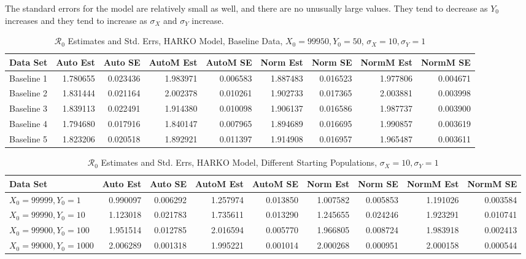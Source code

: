 \documentclass[12pt]{article}
\newcommand{\rr}{\ensuremath{\mathcal{R}_0}}
\begin{document}
The standard errors for the model are relatively small as well, and there are no unusually large values. They tend to decrease as $Y_0$ increases and they tend to increase as $\sigma_X$ and $\sigma_Y$ increase.

\begin{table}[H]
	
	\caption{$\rr$ Estimates and Std. Errs, HARKO Model, 
		Baseline Data, $X_0 = 99950, Y_0 = 50$, 
		$\sigma_X = 10, \sigma_Y = 1$}
	\begin{footnotesize}
		\hskip -1cm
		\begin{tabular}{l|r|r|r|r|r|r|r|r}
			\hline
			Data Set & Auto Est & Auto SE & AutoM Est & AutoM SE & Norm Est & Norm SE & NormM Est & NormM SE\\
			\hline
			Baseline 1 & 1.780655 & 0.023436 & 1.983971 & 0.006583 & 1.887483 & 0.016523 & 1.977806 & 0.004671\\
			\hline
			Baseline 2 & 1.831444 & 0.021164 & 2.002378 & 0.010261 & 1.902733 & 0.017365 & 2.003881 & 0.003998\\
			\hline
			Baseline 3 & 1.839113 & 0.022491 & 1.914380 & 0.010098 & 1.906137 & 0.016586 & 1.987737 & 0.003900\\
			\hline
			Baseline 4 & 1.794680 & 0.017916 & 1.840147 & 0.007965 & 1.894689 & 0.016695 & 1.990857 & 0.003619\\
			\hline
			Baseline 5 & 1.823206 & 0.020518 & 1.892921 & 0.011397 & 1.914908 & 0.016957 & 1.965487 & 0.003611\\
			\hline
		\end{tabular}
	\end{footnotesize}
\end{table}

\begin{table}[H]
	
	\caption{$\rr$ Estimates and Std. Errs, HARKO Model,
		Different Starting Populations, 
		$\sigma_X = 10, \sigma_Y = 1$}
	\begin{footnotesize}
		\hskip -1.7cm
		\begin{tabular}{l|r|r|r|r|r|r|r|r}
			\hline
			Data Set & Auto Est & Auto SE & AutoM Est & AutoM SE & Norm Est & Norm SE & NormM Est & NormM SE\\
			\hline
			$X_0 = 99999, Y_0 = 1$ & 0.990097 & 0.006292 & 1.257974 & 0.013850 & 1.007582 & 0.005853 & 1.191026 & 0.003584\\
			\hline
			$X_0 = 99990, Y_0 = 10$ & 1.123018 & 0.021783 & 1.735611 & 0.013290 & 1.245655 & 0.024246 & 1.923291 & 0.010741\\
			\hline
			$X_0 = 99900, Y_0 = 100$ & 1.951514 & 0.012785 & 2.016594 & 0.005770 & 1.966805 & 0.008724 & 1.983918 & 0.002413\\
			\hline
			$X_0 = 99000, Y_0 = 1000$ & 2.006289 & 0.001318 & 1.995221 & 0.001014 & 2.000268 & 0.000951 & 2.000158 & 0.000544\\
			\hline
		\end{tabular}
	\end{footnotesize}
\end{table}
\end{document}
